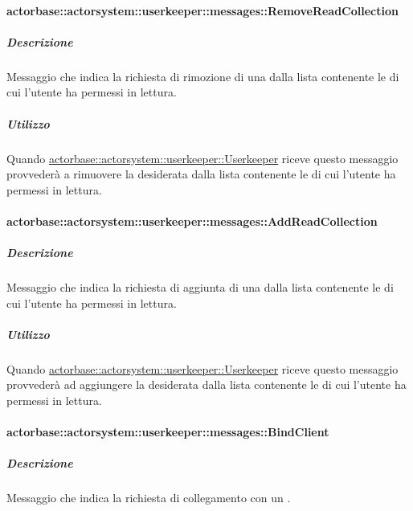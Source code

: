 \documentclass{scalatekids-article}
\begin{document}
\paragraph{actorbase::actorsystem::userkeeper::messages::RemoveReadCollection}
\label{sec:actorbase::actorsystem::userkeeper::messages::RemoveReadCollection}

\subparagraph{Descrizione}

Messaggio che indica la richiesta di rimozione di una  dalla
lista contenente le  di cui l'utente ha permessi in lettura.

\subparagraph{Utilizzo}

Quando \hyperref[sec:actorbase::actorsystem::userkeeper::Userkeeper]{actorbase::\allowbreak{}actorsystem::\allowbreak{}userkeeper::\allowbreak{}Userkeeper}
riceve questo messaggio provvederà a rimuovere la  desiderata
dalla lista contenente le  di cui l'utente ha permessi in
lettura.

\paragraph{actorbase::actorsystem::userkeeper::messages::AddReadCollection}
\label{sec:actorbase::actorsystem::userkeeper::messages::AddReadCollection}

\subparagraph{Descrizione}

Messaggio che indica la richiesta di aggiunta di una  dalla
lista contenente le  di cui l'utente ha permessi in lettura.

\subparagraph{Utilizzo}

Quando \hyperref[sec:actorbase::actorsystem::userkeeper::Userkeeper]{actorbase::\allowbreak{}actorsystem::\allowbreak{}userkeeper::\allowbreak{}Userkeeper}
riceve questo messaggio provvederà ad aggiungere la  desiderata
dalla lista contenente le  di cui l'utente ha permessi in
lettura.

\paragraph{actorbase::actorsystem::userkeeper::messages::BindClient}
\label{sec:actorbase::actorsystem::userkeeper::messages::BindClient}

\subparagraph{Descrizione}

Messaggio che indica la richiesta di collegamento con un .
\end{document}
